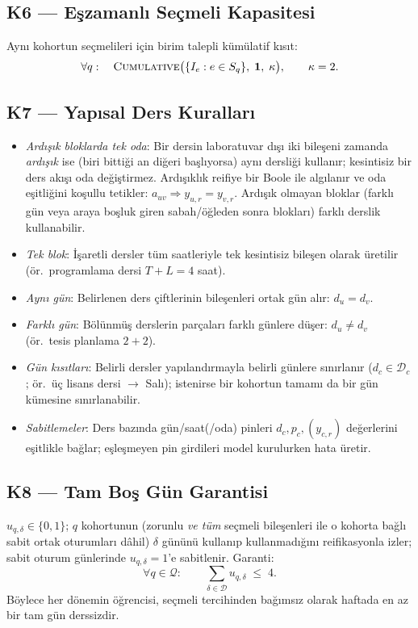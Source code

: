 \documentclass[11pt,a4paper]{article}
\theoremstyle{definition}
\newcommand{\SET}[1]{\mathcal{#1}}
\begin{document}
\subsection*{K6 --- Eşzamanlı Seçmeli Kapasitesi}
Aynı kohortun seçmelileri için birim talepli kümülatif kısıt:
\begin{equation}
\forall q:\quad \textsc{Cumulative}\bigl(\{I_e : e\in S_q\},\;
\mathbf{1},\; \kappa\bigr),\qquad \kappa=2 .
\end{equation}

\subsection*{K7 --- Yapısal Ders Kuralları}
\begin{itemize}[nosep]
\item \emph{Ardışık bloklarda tek oda}: Bir dersin laboratuvar dışı iki bileşeni
  zamanda \emph{ardışık} ise (biri bittiği an diğeri başlıyorsa) aynı dersliği
  kullanır; kesintisiz bir ders akışı oda değiştirmez. Ardışıklık reifiye bir
  Boole ile algılanır ve oda eşitliğini koşullu tetikler:
  $a_{uv}\Rightarrow y_{u,r}=y_{v,r}$. Ardışık olmayan bloklar (farklı gün veya
  araya boşluk giren sabah/öğleden sonra blokları) farklı derslik kullanabilir.
\item \emph{Tek blok}: İşaretli dersler tüm saatleriyle tek kesintisiz bileşen
  olarak üretilir (ör.\ programlama dersi $T{+}L=4$ saat).
\item \emph{Aynı gün}: Belirlenen ders çiftlerinin bileşenleri ortak gün alır:
  $d_u=d_v$.
\item \emph{Farklı gün}: Bölünmüş derslerin parçaları farklı günlere düşer:
  $d_u\ne d_v$ (ör.\ tesis planlama $2{+}2$).
\item \emph{Gün kısıtları}: Belirli dersler yapılandırmayla belirli günlere
  sınırlanır ($d_c\in\SET{D}_c$; ör.\ üç lisans dersi $\to$ Salı); istenirse bir
  kohortun tamamı da bir gün kümesine sınırlanabilir.
\item \emph{Sabitlemeler}: Ders bazında gün/saat(/oda) pinleri $d_c,p_c,(y_{c,r})$
  değerlerini eşitlikle bağlar; eşleşmeyen pin girdileri model kurulurken hata
  üretir.
\end{itemize}

\subsection*{K8 --- Tam Boş Gün Garantisi}
$u_{q,\delta}\in\{0,1\}$; $q$ kohortunun (zorunlu \emph{ve tüm} seçmeli
bileşenleri ile o kohorta bağlı sabit ortak oturumları dâhil) $\delta$ gününü
kullanıp kullanmadığını reifikasyonla izler; sabit oturum günlerinde
$u_{q,\delta}=1$'e sabitlenir. Garanti:
\begin{equation}
\forall q\in\SET{Q}:\qquad \sum_{\delta\in\SET{D}} u_{q,\delta} \;\le\; 4 .
\end{equation}
Böylece her dönemin öğrencisi, seçmeli tercihinden bağımsız olarak haftada en az
bir tam gün derssizdir.
\end{document}
